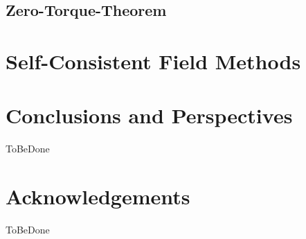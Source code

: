 \documentclass[12pt]{article}
\begin{document}
\subsection{Zero-Torque-Theorem}

\section{Self-Consistent Field Methods}

\section{Conclusions and Perspectives}
ToBeDone

\section{Acknowledgements}
ToBeDone

\newpage


\end{document}
